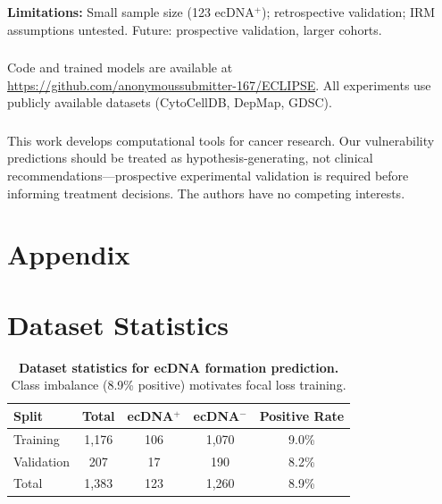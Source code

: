 \documentclass[runningheads]{llncs}
\begin{document}
\textbf{Limitations:} Small sample size (123 ecDNA$^+$); retrospective validation; IRM assumptions untested. Future: prospective validation, larger cohorts.


\begin{credits}
\subsubsection{\ackname}
Code and trained models are available at \url{https://github.com/anonymoussubmitter-167/ECLIPSE}. All experiments use publicly available datasets (CytoCellDB, DepMap, GDSC).

\subsubsection{\discintname}
This work develops computational tools for cancer research. Our vulnerability predictions should be treated as hypothesis-generating, not clinical recommendations---prospective experimental validation is required before informing treatment decisions. The authors have no competing interests.
\end{credits}






\clearpage
\appendix
\section*{Appendix}

\section{Dataset Statistics}
\label{app:datasets}

\begin{table}[h]
\caption{\textbf{Dataset statistics for ecDNA formation prediction.} Class imbalance (8.9\% positive) motivates focal loss training.}
\label{tab:dataset_stats}
\centering
\footnotesize
\begin{tabular}{@{}lcccc@{}}
\toprule
Split & Total & ecDNA$^+$ & ecDNA$^-$ & Positive Rate \\
\midrule
Training & 1,176 & 106 & 1,070 & 9.0\% \\
Validation & 207 & 17 & 190 & 8.2\% \\
\midrule
Total & 1,383 & 123 & 1,260 & 8.9\% \\
\bottomrule
\end{tabular}
\end{table}
\end{document}
